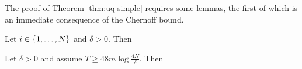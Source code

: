 The proof of Theorem \ref{thm:uq-simple} requires some lemmas, the first of which is an immediate consequence of the Chernoff bound.

\begin{lemma}\label{lem:conc1}
Let $i \in \left\{1,\ldots, N\right\}$ and $\delta > 0$. Then
\end{lemma}

\iffalse
\begin{proof}
Let $Z_t = \ind{X_{i,t} = 1} \in \set{0,1}$.
Then
\eq{
\hat q_i = \frac{2}{T} \sum_{t=1}^{T/2} Z_t\,.
}
Now $Z_1,\ldots,Z_{T/2}$ is an i.i.d.\ sequence of Bernoulli random variables with with mean $q_i$. The result follows from the Chernoff bound.
\end{proof}
\fi

\begin{lemma}\label{lem:m_est}
Let $\delta >0$ and assume $T \geq 48m \log\frac{4N}{\delta}$. Then
\end{lemma}



